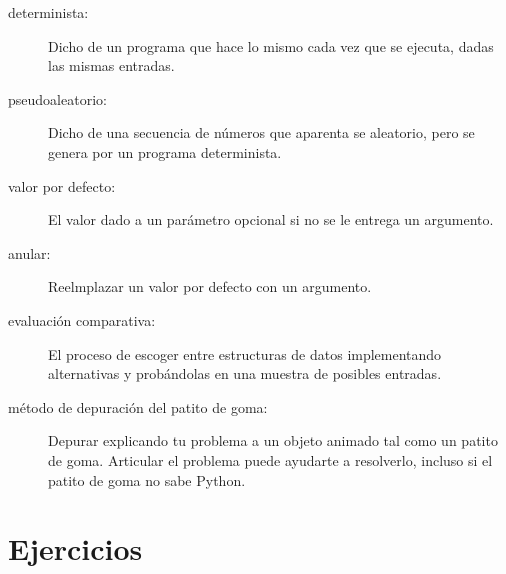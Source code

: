 \documentclass[10pt]{book}
\begin{document}
\begin{description}

\item[determinista:] Dicho de un programa que hace lo
mismo cada vez que se ejecuta, dadas las mismas entradas.

\item[pseudoaleatorio:] Dicho de una secuencia de números que aparenta
se aleatorio, pero se genera por un programa determinista.

\item[valor por defecto:] El valor dado a un parámetro opcional si
no se le entrega un argumento.

\item[anular:] Reelmplazar un valor por defecto con un argumento.

\item[evaluación comparativa:] El proceso de escoger entre estructuras de datos
implementando alternativas y probándolas en una muestra de
posibles entradas.

\item[método de depuración del patito de goma:] Depurar explicando tu problema
a un objeto animado tal como un patito de goma.  Articular el
problema puede ayudarte a resolverlo, incluso si el patito de goma no sabe
Python.

\end{description}


\section{Ejercicios}
\end{document}
